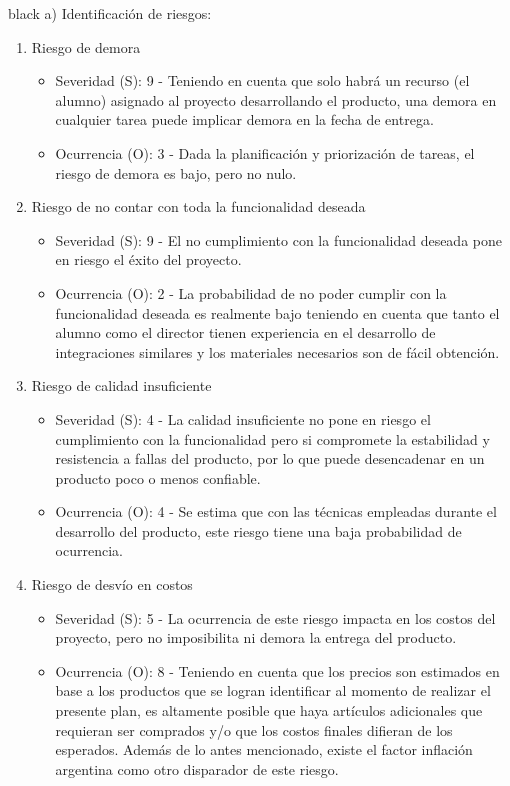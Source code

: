 \documentclass[
11pt, %
]{charter}
\begin{document}
\begin{consigna}{black}
a) Identificación de riesgos:

\begin{enumerate}

\item Riesgo de demora
\begin{itemize}
	\item Severidad (S): 9 - Teniendo en cuenta que solo habrá un recurso (el alumno) asignado al proyecto desarrollando el producto, una demora en cualquier tarea puede implicar demora en la fecha de entrega.
	\item Ocurrencia (O): 3 - Dada la planificación y priorización de tareas, el riesgo de demora es bajo, pero no nulo.
\end{itemize}


\item Riesgo de no contar con toda la funcionalidad deseada
\begin{itemize}
	\item Severidad (S): 9 - El no cumplimiento con la funcionalidad deseada pone en riesgo el éxito del proyecto.
	\item Ocurrencia (O): 2 - La probabilidad de no poder cumplir con la funcionalidad deseada es realmente bajo teniendo en cuenta que tanto el alumno como el director tienen experiencia en el desarrollo de integraciones similares y los materiales necesarios son de fácil obtención.
\end{itemize}

\item Riesgo de calidad insuficiente
\begin{itemize}
	\item Severidad (S): 4 - La calidad insuficiente no pone en riesgo el cumplimiento con la funcionalidad pero si compromete la estabilidad y resistencia a fallas del producto, por lo que puede desencadenar en un producto poco o menos confiable.
	\item Ocurrencia (O): 4 - Se estima que con las técnicas empleadas durante el desarrollo del producto, este riesgo tiene una baja probabilidad de ocurrencia.
\end{itemize}


\item Riesgo de desvío en costos
\begin{itemize}
	\item Severidad (S): 5 - La ocurrencia de este riesgo impacta en los costos del proyecto, pero no imposibilita ni demora la entrega del producto.
	\item Ocurrencia (O): 8 - Teniendo en cuenta que los precios son estimados en base a los productos que se logran identificar al momento de realizar el presente plan, es altamente posible que haya artículos adicionales que requieran ser comprados y/o que los costos finales difieran de los esperados. Además de lo antes mencionado, existe el factor inflación argentina como otro disparador de este riesgo.
\end{itemize}


\end{enumerate}
\end{consigna}
\end{document}
